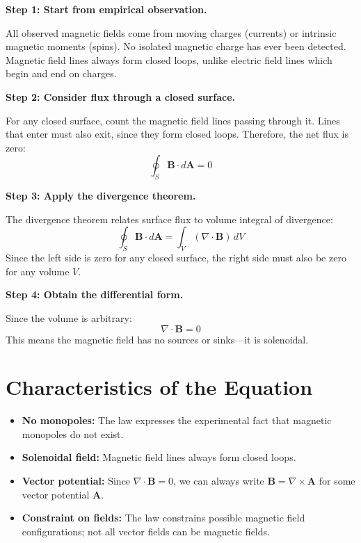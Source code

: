 \textbf{Step 1: Start from empirical observation.}

All observed magnetic fields come from moving charges (currents) or intrinsic magnetic moments (spins). No isolated magnetic charge has ever been detected. Magnetic field lines always form closed loops, unlike electric field lines which begin and end on charges.

\textbf{Step 2: Consider flux through a closed surface.}

For any closed surface, count the magnetic field lines passing through it. Lines that enter must also exit, since they form closed loops. Therefore, the net flux is zero:
\begin{equation}
\oint_S \mathbf{B} \cdot d\mathbf{A} = 0
\end{equation}

\textbf{Step 3: Apply the divergence theorem.}

The divergence theorem relates surface flux to volume integral of divergence:
\begin{equation}
\oint_S \mathbf{B} \cdot d\mathbf{A} = \int_V (\nabla \cdot \mathbf{B}) \, dV
\end{equation}
Since the left side is zero for any closed surface, the right side must also be zero for any volume $V$.

\textbf{Step 4: Obtain the differential form.}

Since the volume is arbitrary:
\begin{equation}
\boxed{\nabla \cdot \mathbf{B} = 0}
\end{equation}
This means the magnetic field has no sources or sinks---it is solenoidal.

\section*{Characteristics of the Equation}

\begin{itemize}
\item \textbf{No monopoles:} The law expresses the experimental fact that magnetic monopoles do not exist.
\item \textbf{Solenoidal field:} Magnetic field lines always form closed loops.
\item \textbf{Vector potential:} Since $\nabla \cdot \mathbf{B} = 0$, we can always write $\mathbf{B} = \nabla \times \mathbf{A}$ for some vector potential $\mathbf{A}$.
\item \textbf{Constraint on fields:} The law constrains possible magnetic field configurations; not all vector fields can be magnetic fields.
\end{itemize}

